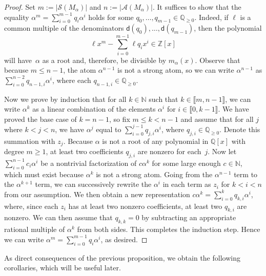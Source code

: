 \documentclass[11pt]{amsart}
\theoremstyle{definition}
\theoremstyle{remark}
\numberwithin{equation}{section}
\newcommand{\nn}{\mathbb{N}}
\newcommand{\N}{\mathbb{N}}
\newcommand{\qq}{\mathbb{Q}}
\newcommand{\Q}{\mathbb{Q}}
\newcommand{\zz}{\mathbb{Z}}
\providecommand\ldb{\llbracket}
\providecommand\rdb{\rrbracket}
\begin{document}
\begin{proof}
    Set $m := |\mathcal{S}(M_\alpha)|$ and $n := |\mathcal{A}(M_\alpha)|$. It suffices to show that the equality $\alpha^m = \sum_{i=0}^{m-1} q_i\alpha^i$ holds for some $q_0, \dots, q_{m-1} \in \Q_{\ge 0}$. Indeed, if $\ell$ is a common multiple of the denominators $\mathsf{d}(q_0), \dots, \mathsf{d}(q_{m-1})$, then the polynomial
    \[
        \ell x^m - \sum_{i=0}^{m-1} \ell q_i x^i \in \zz[x]
    \]
    will have~$\alpha$ as a root and, therefore, be divisible by $m_\alpha(x)$. Observe that because $m \le n-1$, the atom $\alpha^{n-1}$ is not a strong atom, so we can write $\alpha^{n-1}$ as $\sum_{i=0}^{n-2} q_{n-1,i}\alpha^i$, where each $q_{n-1,i}\in\qq_{\ge 0}$.
    
    Now we prove by induction that for all $k \in \nn$ such that $k \in \ldb m,n-1 \rdb$, we can write $\alpha^k$ as a linear combination of the elements $\alpha^i$ for $i \in \ldb 0,k-1 \rdb$. We have proved the base case of $k = n - 1$, so fix $m \leq k < n - 1$ and assume that for all $j$ where $k< j<n$, we have $\alpha^j$ equal to $\sum_{i=0}^{j-1}q_{j,i}\alpha^i$, where $q_{j,i}\in \qq_{\ge 0}$. Denote this summation with $z_j$. Because $\alpha$ is not a root of any polynomial in $\qq[x]$ with degree $m \ge 1$, at least two coefficients $q_{j,i}$ are nonzero for each~$j$. Now let $\sum_{i=0}^{n-1}c_i\alpha^i$ be a nontrivial factorization of $c\alpha^k$ for some large enough $c\in\N$, which must exist because $\alpha^k$ is not a strong atom. Going from the $\alpha^{n-1}$ term to the $\alpha^{k+1}$ term, we can successively rewrite the $\alpha^i$ in each term as $z_i$ for $k< i<n$ from our assumption. We then obtain a new representation $c\alpha^k=\sum_{i=0}^k q_{k,i}\alpha^i$, where, since each $z_i$ has at least two nonzero coefficients, at least two $q_{k,i}$ are nonzero. We can then assume that $q_{k,k}=0$ by subtracting an appropriate rational multiple of $\alpha^k$ from both sides. This completes the induction step. Hence we can write $\alpha^m = \sum_{i=0}^{m-1} q_i\alpha^i$, as desired.
\end{proof}

As direct consequences of the previous proposition, we obtain the following corollaries, which will be useful later.
\end{document}
